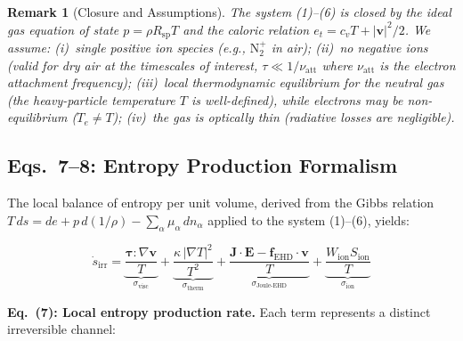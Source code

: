 \documentclass[12pt,twocolumn]{article}
\newtheorem{remark}{Remark}
\newcommand{\ee}{\mathbf{E}}
\newcommand{\jj}{\mathbf{J}}
\newcommand{\vv}{\mathbf{v}}
\newcommand{\ff}{\mathbf{f}}
\newcommand{\sdot}{\dot{s}_{\mathrm{irr}}}
\begin{document}
\begin{remark}[Closure and Assumptions]
\label{rem:closure}
The system (1)--(6) is closed by the ideal gas equation of state
$p = \rho R_{\mathrm{sp}} T$ and the caloric relation
$e_t = c_v T + |\vv|^2/2$. We assume: (i)~single positive ion
species (e.g., $\mathrm{N}_2^+$ in air); (ii)~no negative ions
(valid for dry air at the timescales of interest,
$\tau \ll 1/\nu_{\mathrm{att}}$ where $\nu_{\mathrm{att}}$ is the
electron attachment frequency); (iii)~local thermodynamic equilibrium
for the neutral gas (the heavy-particle temperature $T$ is
well-defined), while electrons may be non-equilibrium
($T_e \neq T$); (iv)~the gas is optically thin (radiative losses
are negligible).
\end{remark}

\subsection{Eqs.~7--8: Entropy Production Formalism}
\label{sec:entropy}

The local balance of entropy per unit volume, derived from the
Gibbs relation $T\,ds = de + p\,d(1/\rho) - \sum_\alpha \mu_\alpha
\,dn_\alpha$ applied to the system (1)--(6), yields:

\begin{equation}
\boxed{
  \sdot
  = \underbrace{\frac{\bm{\tau} : \nabla\vv}{T}}_{\sigma_{\mathrm{visc}}}
  + \underbrace{\frac{\kappa\,|\nabla T|^2}{T^2}}_{\sigma_{\mathrm{therm}}}
  + \underbrace{\frac{\jj \cdot \ee
    - \ff_{\mathrm{EHD}} \cdot \vv}{T}}_{\sigma_{\mathrm{Joule\text{-}EHD}}}
  + \underbrace{\frac{W_{\mathrm{ion}}
    S_{\mathrm{ion}}}{T}}_{\sigma_{\mathrm{ion}}}
}
\tag{7}
\label{eq:entropy_local}
\end{equation}

\noindent
\textbf{Eq.~(7): Local entropy production rate.} Each term represents
a distinct irreversible channel:
\end{document}

